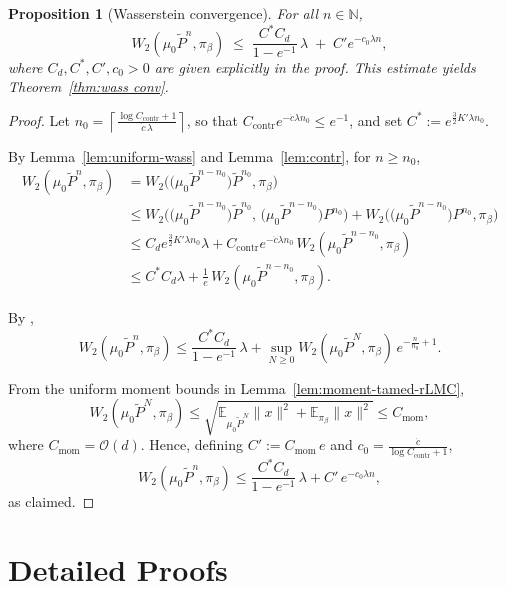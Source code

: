 \documentclass[11pt,a4paper,reqno]{amsart}
\theoremstyle{plain}
\newtheorem{proposition}{Proposition}
\theoremstyle{definition}
\theoremstyle{remark}
\newcommand{\E}{\mathbb{E}}
\begin{document}
\begin{proposition}[Wasserstein convergence]
\label{prop:Wasserstein-convergence}
For all \(n\in\mathbb{N}\),
\[
  W_2(\mu_0\widetilde{P}^n,\pi_\beta)
  \;\le\;
  \frac{C^* C_d}{1-e^{-1}}\,\lambda
  \;+\;
  C' e^{-c_0\lambda n},
\]
where \(C_d, C^*, C', c_0 > 0\) are given explicitly in the proof. This estimate yields Theorem~\ref{thm:wass conv}.
\end{proposition}

\begin{proof}
Let \(n_0=\left\lceil \frac{\log C_{\mathrm{contr}}+1}{\dot c\,\lambda}\right\rceil\), so that \(C_{\mathrm{contr}}e^{-\dot c\lambda n_0}\le e^{-1}\), and set \(C^*:=e^{\frac32 K'\lambda n_0}\).

By Lemma~\ref{lem:uniform-wass} and Lemma~\ref{lem:contr}, for \(n\ge n_0\),
\[
\begin{aligned}
  W_2(\mu_0\widetilde{P}^n,\pi_\beta)
  &= W_2\bigl(\bigl(\mu_0\widetilde{P}^{n-n_0}\bigr)\widetilde{P}^{n_0},\pi_\beta\bigr) \\
  &\le
  W_2\bigl(\bigl(\mu_0\widetilde{P}^{n-n_0}\bigr)\widetilde{P}^{n_0},\,\bigl(\mu_0\widetilde{P}^{n-n_0}\bigr)P^{n_0}\bigr)
  + W_2\bigl(\bigl(\mu_0\widetilde{P}^{n-n_0}\bigr)P^{n_0},\pi_\beta\bigr) \\
  &\le
  C_d e^{\frac{3}{2}K'\lambda n_0}\lambda
  + C_{\mathrm{contr}} e^{-\dot{c}\lambda n_0}\,
  W_2(\mu_0\widetilde{P}^{n-n_0},\pi_\beta) \\
  &\le C^* C_d \lambda
  + \frac{1}{e}\, W_2(\mu_0\widetilde{P}^{n-n_0},\pi_\beta).
\end{aligned}
\]

By \cite[Lemma 3.18]{ye2024error},
\[
  W_2(\mu_0\widetilde{P}^n,\pi_\beta)
  \le
  \frac{C^* C_d}{1-e^{-1}}\,\lambda
  + \sup_{N\ge 0} W_2(\mu_0\widetilde{P}^{N},\pi_\beta)\, e^{-\frac{n}{n_0}+1}.
\]

From the uniform moment bounds in Lemma~\ref{lem:moment-tamed-rLMC},
\[
  W_2(\mu_0\widetilde{P}^{N},\pi_\beta)
  \le
  \sqrt{\E_{\mu_0\widetilde{P}^{N}}\|x\|^2 + \E_{\pi_\beta}\|x\|^2}
  \le
  C_{\mathrm{mom}},
\]
where \(C_{\mathrm{mom}}=\mathcal{O}(d)\). Hence, defining $C':=C_{\mathrm{mom}}\,e$ and $c_0 = \frac{\dot{c}}{\log C_{\mathrm{contr}} + 1}$,
\[
  W_2(\mu_0\widetilde P^n,\pi_\beta)
  \le
  \frac{C^* C_d}{1-e^{-1}}\,\lambda
  + C'\,e^{-c_0\lambda n},
\]
as claimed.
\end{proof}


\section{Detailed Proofs}
\label{sec:proof-section}
\end{document}
